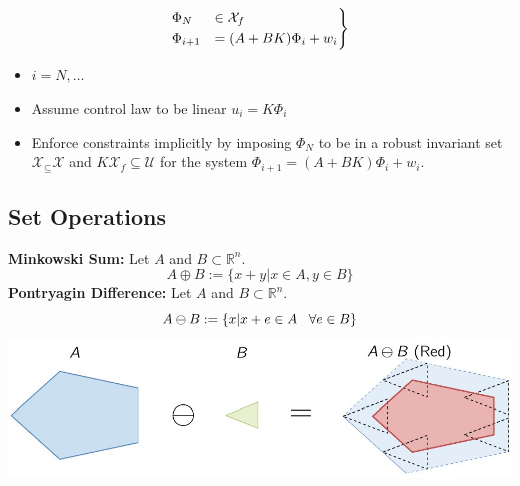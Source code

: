      \begin{minipage}{0.22\linewidth}
        \begin{align*}
        \begin{rcases}
            \Phi_N &\in \mathcal{X}_f\\
            \Phi_{i+1} &= (A+BK)\Phi _i+w_i
        \end{rcases}
        \end{align*}
    \end{minipage}
    \begin{minipage}{0.6\linewidth}
         \begin{itemize}
             \item $i=N,\dots$
             \item Assume control law to be linear $u_i=K\Phi_i$
             \item Enforce constraints implicitly by imposing $\Phi_N$ to be in a robust invariant set $\mathcal{X}_\subseteq \mathcal{X}$ and $K\mathcal{X}_f \subseteq\mathcal{U}$ for the system $\Phi_{i+1} = (A+BK)\Phi_i+w_i$.
         \end{itemize}
    \end{minipage}
    \subsection{Set Operations}
    \textbf{Minkowski Sum:} Let $A$ and $B\subset\mathbb{R}^n$. 
    \[A\oplus B := \{x+y | x \in A,y\in B\}\]
    \textbf{Pontryagin Difference:} Let $A$ and $B\subset\mathbb{R}^n$. 
     \[A\ominus B := \{x|x+e\in A \hspace{3mm}\forall e \in B\}\]
     \includegraphics[width=0.9\linewidth]{MPC_summary/Images/PontryaginDiff.jpg}